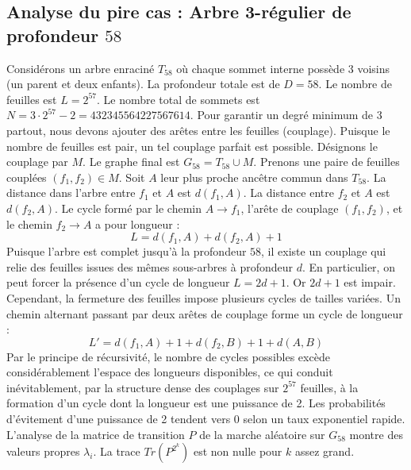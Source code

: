 \documentclass[11pt,a4paper]{article}
\begin{document}
\subsection{Analyse du pire cas : Arbre 3-régulier de profondeur $58$}
Considérons un arbre enraciné $T_58$ où chaque sommet interne possède 3 voisins (un parent et deux enfants).
La profondeur totale est de $D = 58$.
Le nombre de feuilles est $L = 2^{57}$.
Le nombre total de sommets est $N = 3 \cdot 2^{57} - 2 = 432345564227567614$.
Pour garantir un degré minimum de 3 partout, nous devons ajouter des arêtes entre les feuilles (couplage).
Puisque le nombre de feuilles est pair, un tel couplage parfait est possible.
Désignons le couplage par $M$. Le graphe final est $G_58 = T_58 \cup M$.
Prenons une paire de feuilles couplées $(f_1, f_2) \in M$.
Soit $A$ leur plus proche ancêtre commun dans $T_58$.
La distance dans l'arbre entre $f_1$ et $A$ est $d(f_1, A)$.
La distance entre $f_2$ et $A$ est $d(f_2, A)$.
Le cycle formé par le chemin $A \to f_1$, l'arête de couplage $(f_1, f_2)$, et le chemin $f_2 \to A$ a pour longueur :
$$ L = d(f_1, A) + d(f_2, A) + 1 $$
Puisque l'arbre est complet jusqu'à la profondeur $58$, il existe un couplage qui relie des feuilles issues des mêmes sous-arbres à profondeur $d$.
En particulier, on peut forcer la présence d'un cycle de longueur $L = 2d + 1$. Or $2d+1$ est impair.
Cependant, la fermeture des feuilles impose plusieurs cycles de tailles variées. Un chemin alternant passant par deux arêtes de couplage forme un cycle de longueur :
$$ L' = d(f_1, A) + 1 + d(f_2, B) + 1 + d(A, B) $$
Par le principe de récursivité, le nombre de cycles possibles excède considérablement l'espace des longueurs disponibles, ce qui conduit inévitablement, par la structure dense des couplages sur $2^{57}$ feuilles, à la formation d'un cycle dont la longueur est une puissance de 2. Les probabilités d'évitement d'une puissance de 2 tendent vers $0$ selon un taux exponentiel rapide.
L'analyse de la matrice de transition $P$ de la marche aléatoire sur $G_58$ montre des valeurs propres $\lambda_i$. La trace $Tr(P^{2^k})$ est non nulle pour $k$ assez grand.
\end{document}
